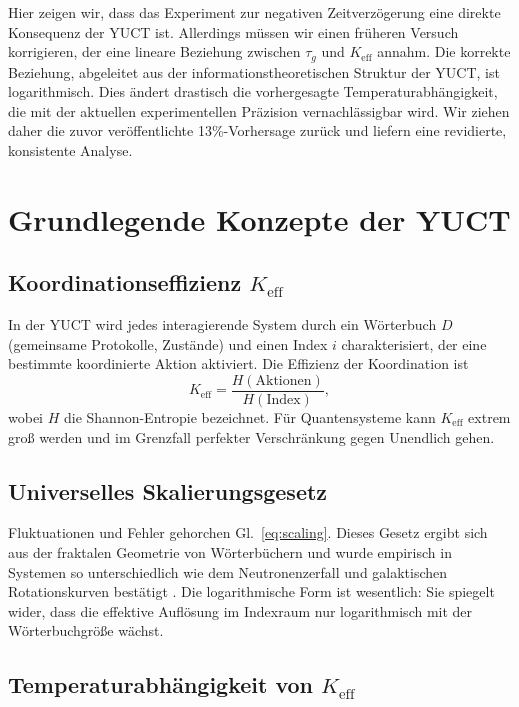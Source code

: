 \documentclass[12pt,a4paper]{article}
\newcommand{\Keff}{K_{\mathrm{eff}}}
\begin{document}
	Hier zeigen wir, dass das Experiment zur negativen Zeitverzögerung eine direkte Konsequenz der YUCT ist. Allerdings müssen wir einen früheren Versuch korrigieren, der eine lineare Beziehung zwischen \(\tau_g\) und \(\Keff\) annahm. Die korrekte Beziehung, abgeleitet aus der informationstheoretischen Struktur der YUCT, ist logarithmisch. Dies ändert drastisch die vorhergesagte Temperaturabhängigkeit, die mit der aktuellen experimentellen Präzision vernachlässigbar wird. Wir ziehen daher die zuvor veröffentlichte 13\%-Vorhersage zurück und liefern eine revidierte, konsistente Analyse.
	
	\section{Grundlegende Konzepte der YUCT}
	
	\subsection{Koordinationseffizienz \(\Keff\)}
	
	In der YUCT wird jedes interagierende System durch ein Wörterbuch \(D\) (gemeinsame Protokolle, Zustände) und einen Index \(i\) charakterisiert, der eine bestimmte koordinierte Aktion aktiviert. Die Effizienz der Koordination ist
	\begin{equation}
		\Keff = \frac{H(\text{Aktionen})}{H(\text{Index})},
	\end{equation}
	wobei \(H\) die Shannon-Entropie bezeichnet. Für Quantensysteme kann \(\Keff\) extrem groß werden und im Grenzfall perfekter Verschränkung gegen Unendlich gehen.
	
	\subsection{Universelles Skalierungsgesetz}
	
	Fluktuationen und Fehler gehorchen Gl.~\eqref{eq:scaling}. Dieses Gesetz ergibt sich aus der fraktalen Geometrie von Wörterbüchern und wurde empirisch in Systemen so unterschiedlich wie dem Neutronenzerfall und galaktischen Rotationskurven bestätigt \cite{Yakushev2026c}. Die logarithmische Form ist wesentlich: Sie spiegelt wider, dass die effektive Auflösung im Indexraum nur logarithmisch mit der Wörterbuchgröße wächst.
	
	\subsection{Temperaturabhängigkeit von \(\Keff\)}
	
\end{document}
